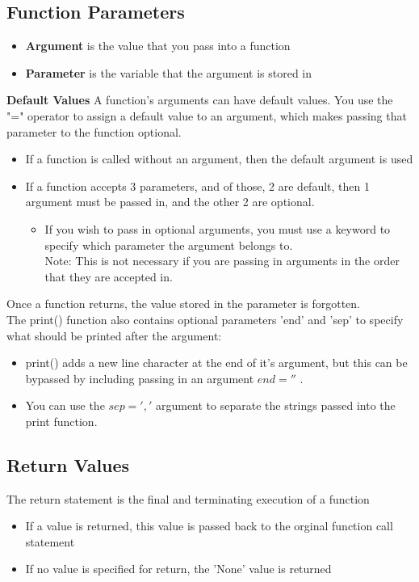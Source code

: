 \subsection{Function Parameters}
\begin{itemize}
    \item \textbf{Argument} is the value that you pass into a function
    \item \textbf{Parameter} is the variable that the argument is stored in
\end{itemize}

\textbf{Default Values}
A function's arguments can have default values. You use the "=" operator to assign a default value to an argument, which makes passing that parameter to the function optional.
\begin{itemize}
    \item If a function is called without an argument, then the default argument is used
    \item If a function accepts 3 parameters, and of those, 2 are default, then 1 argument must be passed in, and the other 2 are optional.
    \begin{itemize}
        \item If you wish to pass in optional arguments, you must use a keyword to specify which parameter the argument belongs to.\\
        Note: This is not necessary if you are passing in arguments in the order that they are accepted in.
    \end{itemize}
\end{itemize}
Once a function returns, the value stored in the parameter is forgotten.\\
The print() function also contains optional parameters 'end' and 'sep' to specify what should be printed after the argument:
\begin{itemize}
    \item print() adds a new line character at the end of it's argument, but this can be bypassed by including passing in an argument $end = ''$ .
    \item You can use the $sep=','$ argument to separate the strings passed into the print function.
\end{itemize}

\subsection{Return Values}
The return statement is the final and terminating execution of a function
\begin{itemize}
    \item If a value is returned, this value is passed back to the orginal function call statement
    \item If no value is specified for return, the 'None' value is returned
\end{itemize}


